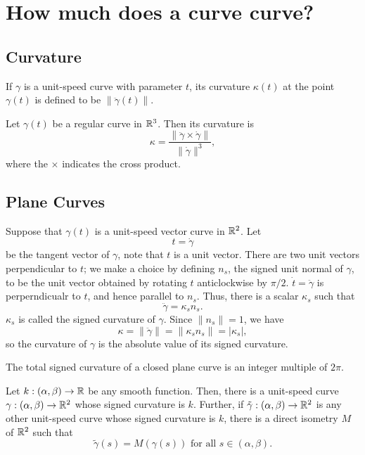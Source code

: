\section{How much does a curve curve?}

\subsection{Curvature}

\begin{defn}
  If $\gamma$ is a unit-speed curve with parameter $t$, its curvature $\kappa(t)$
  at the point $\gamma(t)$ is defined to be $\|\ddot{\gamma}(t)\|$.
\end{defn}

\begin{proposition}
  Let $\gamma(t)$ be a regular curve in $\mathbb{R}^3$. Then its curvature is
  \[
    \kappa = \frac{\|\ddot{\gamma} \times \dot{\gamma}\|}{\|\dot{\gamma}\|^3},
  \]
  where the $\times$ indicates the cross product.
\end{proposition}

\subsection{Plane Curves}

Suppose that $\gamma(t)$ is a unit-speed vector curve in $\mathbb{R}^2$. Let
\[
  t = \dot{\gamma}
\]
be the tangent vector of $\gamma$, note that $t$ is a unit vector.
There are two unit vectors perpendicular to $t$; we make a choice by defining $n_s$,
the signed unit normal of $\gamma$, to be the unit vector obtained by rotating $t$
anticlockwise by $\pi/2$.
$\dot{t} = \ddot{\gamma}$ is perperndicualr to $t$, and hence parallel to $n_s$.
Thus, there is a scalar $\kappa_s$ such that
\[
  \ddot{\gamma} = \kappa_s n_s.
\]
$\kappa_s$ is called the signed curvature of $\gamma$. Since $\|n_s\| = 1$, we have
\[
  \kappa = \|\ddot{\gamma}\| = \|\kappa_s n_s\| = |\kappa_s|,
\]
so the curvature of $\gamma$ is the absolute value of its signed curvature.


\begin{corollary}
  The total signed curvature of a closed plane curve is an integer multiple of $2\pi$.
\end{corollary}

\begin{theorem}
  Let $k: (\alpha, \beta) \to \mathbb{R}$ be any smooth function.
  Then, there is a unit-speed curve
  $\gamma: (\alpha, \beta) \to \mathbb{R}^2$ whose signed curvature is $k$.
  Further, if $\tilde \gamma: (\alpha, \beta) \to \mathbb{R}^2$ is any other unit-speed curve
  whose signed curvature is $k$, there is a direct isometry $M$ of $\mathbb{R}^2$ such that
  \[
    \tilde \gamma(s) = M(\gamma(s)) \text{ for all } s \in (\alpha, \beta).
  \]
\end{theorem}